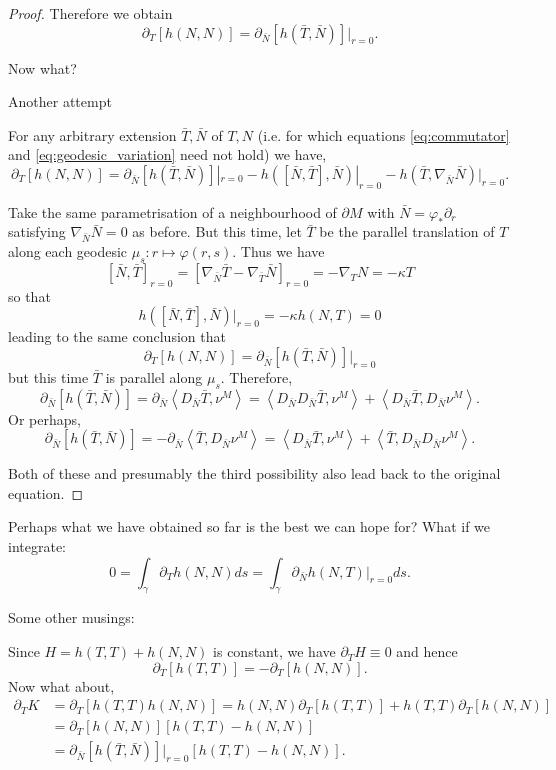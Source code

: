 \documentclass[10pt]{amsart}
\newcommand{\IP}[2]{\left< #1 , #2 \right>}
\theoremstyle{remark}
\begin{document}
\begin{proof}
Therefore we obtain
\[
\partial_T [h(N, N)] = \partial_{\bar{N}} [h(\bar{T}, \bar{N})]|_{r=0}.
\]

{\color{red} Now what?}

{\color{red} Another attempt}

For any arbitrary extension \(\bar{T}, \bar{N}\) of \(T, N\) (i.e. for which equations \eqref{eq:commutator} and \eqref{eq:geodesic_variation} need not hold) we have,
\[
\partial_T [h(N, N)] = \partial_{\bar{N}} [h(\bar{T}, \bar{N})]|_{r=0} - h([\bar{N}, \bar{T}], \bar{N})|_{r=0} - h(\bar{T}, \nabla_{\bar{N}} \bar{N})|_{r=0}.
\]

Take the same parametrisation of a neighbourhood of \(\partial M\) with \(\bar{N} = \varphi_{\ast} \partial_r\) satisfying \(\nabla_{\bar{N}} \bar{N} = 0\) as before. But this time, let \(\bar{T}\) be the parallel translation of \(T\) along each geodesic \(\mu_s : r \mapsto \varphi(r, s)\). Thus we have
\[
[\bar{N}, \bar{T}]_{r=0} = \left[\nabla_{\bar{N}} \bar{T} - \nabla_{\bar{T}} \bar{N}\right]_{r=0} = - \nabla_T N = - \kappa T
\]
so that
\[
h([\bar{N}, \bar{T}], \bar{N})|_{r=0} = -\kappa h(N, T) = 0
\]
leading to the same conclusion that
\[
\partial_T [h(N, N)] = \partial_{\bar{N}} [h(\bar{T}, \bar{N})]|_{r=0}
\]
but this time \(\bar{T}\) is parallel along \(\mu_s\). Therefore,
\[
\partial_{\bar{N}} [h(\bar{T}, \bar{N})] = \partial_{\bar{N}} \IP{D_{\bar{N}} \bar{T}}{\nu^M} = \IP{D_{\bar{N}} D_{\bar{N}} \bar{T}}{\nu^M} + \IP{D_{\bar{N}} \bar{T}}{D_{\bar{N}} \nu^M}.
\]
Or perhaps,
\[
\partial_{\bar{N}} [h(\bar{T}, \bar{N})] = -\partial_{\bar{N}} \IP{\bar{T}}{D_{\bar{N}} \nu^M} = \IP{D_{\bar{N}} \bar{T}}{\nu^M} + \IP{\bar{T}}{D_{\bar{N}} D_{\bar{N}} \nu^M}.
\]

{\color{red} Both of these and presumably the third possibility also lead back to the original equation.}
\end{proof}

{\color{red} Perhaps what we have obtained so far is the best we can hope for? What if we integrate:}
\[
0 = \int_{\gamma} \partial_T h(N, N) ds = \int_{\gamma} \partial_{\bar{N}} h(N, T)|_{r=0} ds.
\]

{\color{red} Some other musings:}

Since \(H = h(T,T) + h(N, N)\) is constant, we have \(\partial_T H \equiv 0\) and hence
\[
\partial_T [h(T, T)] = - \partial_T [h(N, N)].
\]
Now what about,
\[
\begin{split}
\partial_T K &= \partial_T [h(T, T) h(N, N)] = h(N, N) \partial_T [h(T, T)] + h(T, T) \partial_T [h(N, N)] \\
&= \partial_T [h(N, N)] [h(T, T) - h(N, N)] \\
&= \partial_{\bar{N}} [h(\bar{T}, \bar{N})]|_{r=0} [h(T, T) - h(N, N)].
\end{split}
\]
\end{document}
